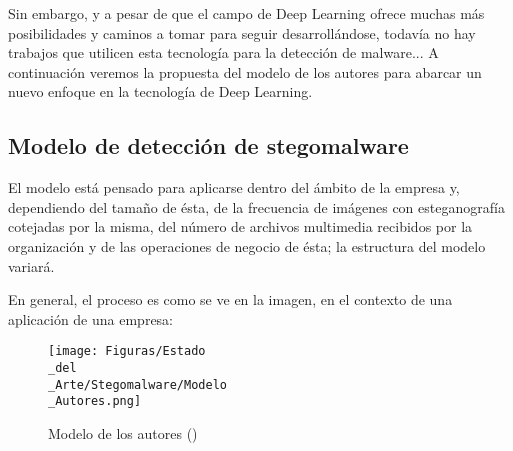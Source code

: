 Sin embargo, y a pesar de que el campo de Deep Learning ofrece muchas más posibilidades y caminos a tomar para seguir desarrollándose, todavía no hay trabajos que utilicen esta tecnología para la detección de malware... A continuación veremos la propuesta del modelo de los autores para abarcar un nuevo enfoque en la tecnología de Deep Learning.

\subsection{Modelo de detección de stegomalware}

El modelo está pensado para aplicarse dentro del ámbito de la empresa y, dependiendo del tamaño de ésta, de la frecuencia de imágenes con esteganografía cotejadas por la misma, del número de archivos multimedia recibidos por la organización y de las operaciones de negocio de ésta; la estructura del modelo variará.

En general, el proceso es como se ve en la imagen, en el contexto de una aplicación de una empresa:

\begin{figure}[H]
  \centering
  \texttt{[image: Figuras/Estado\\\_del\\\_Arte/Stegomalware/Modelo\\\_Autores.png]}
  \label{fig:modelo-autores}
  \caption{Modelo de los autores (\cite{stegomalware})}
\end{figure}

